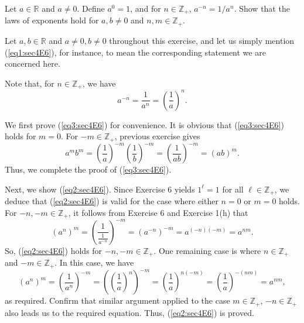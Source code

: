 \documentclass[a4paper,12pt]{article}
\begin{document}
\begin{exe}
	Let \( a \in \mathbb{R} \) and \( a\neq 0 \).
	Define \( a^0 = 1 \),
	and for \( n\in \mathbb{Z}_{+} \),
	\( a^{-n}= 1/{a^n} \).
	Show that the laws of exponents hold for \( a,b\neq 0 \) and \( n,m \in \mathbb{Z}_{+} \).
\end{exe}\begin{sol}
	Let
	\( a,b \in \mathbb{R} \)
	and
	\(a \neq 0, b \neq 0 \)
	throughout this exercise,
	and let us simply mention (\ref{eq1:sec4E6}), for instance, 
	to mean the corresponding statement we are concerned here.
	
	Note that, for \( n \in \mathbb{Z}_{+} \),
	we have 
	\begin{equation*}
		a^{-n} = \frac{1}{a^n} = \left( \frac{1}{a} \right)^n.
	\end{equation*}
	
	We first prove (\ref{eq3:sec4E6}) for convenience.
	It is obvious that (\ref{eq3:sec4E6}) holds for
	\( m =0 \).
	For
	\( -m \in \mathbb{Z}_{+}\),
	previous exercise gives
	\begin{equation*}
		a^{m}b^{m}
		=
		\left( \frac{1}{a} \right)^{-m} \left( \frac{1}{b} \right)^{-m}
		=
		\left( \frac{1}{ab} \right)^{-m}
		=
		(ab)^{m}.
	\end{equation*}
	Thus, we complete the proof of (\ref{eq3:sec4E6}).
	
	Next, we show (\ref{eq2:sec4E6}).
	Since Exercise 6 yields
	\( 1^{\ell}=1 \)
	for all 
	\( \ell \in \mathbb{Z}_{+} \),
	we deduce that (\ref{eq2:sec4E6}) is valid for the case where
	either
	\( n =0 \)
	or
	\( m =0 \)
	holds.
	For
	\( -n, -m \in \mathbb{Z}_{+} \),
	it follows from Exercise 6 and Exercise 1(h) that
	\begin{equation*}
		(a^n)^m
		=
		\left( \frac{1}{\frac{1}{a^{-n}}} \right)^{-m}
		=
		\left( a^{-n} \right)^{-m}
		=
		a^{(-n)(-m)}
		=
		a^{nm}.
	\end{equation*}
	So, (\ref{eq2:sec4E6}) holds for \( -n, -m \in \mathbb{Z}_{+} \).
	One remaining case is where
	\( n \in \mathbb{Z}_{+} \)
	and
	\( -m \in \mathbb{Z}_{+} \).
	In this case,
	we have
	\begin{equation*}
		(a^n)^m
		=
		\left( \frac{1}{a^{n}} \right)^{-m}
		=
		\left( \left( \frac{1}{a} \right)^{n} \right)^{-m}
		=
		\left( \frac{1}{a} \right)^{n(-m)}
		=
		\left( \frac{1}{a} \right)^{-(nm)}
		=
		a^{nm},
	\end{equation*}
	as required.
	Confirm that similar argument applied to the case
	\( m \in \mathbb{Z}_{+} \),
	\( -n \in \mathbb{Z}_{+} \)
	also leads us to the required equation.
	Thus, (\ref{eq2:sec4E6}) is proved.
	

\end{sol}
\end{document}
